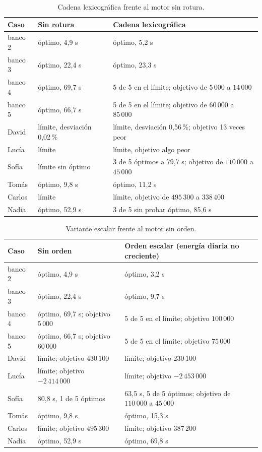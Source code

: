 \begin{table}[htbp]
\centering
\small
\begin{tabular}{|p{1.4cm}|p{4.2cm}|p{7.4cm}|}
\hline
\textbf{Caso} & \textbf{Sin rotura} & \textbf{Cadena lexicográfica} \\
\hline
banco 2 & óptimo, 4,9 s & óptimo, 5,2 s \\
\hline
banco 3 & óptimo, 22,4 s & óptimo, 23,3 s \\
\hline
banco 4 & óptimo, 69,7 s & 5 de 5 en el límite; objetivo de $5\,000$ a $14\,000$ \\
\hline
banco 5 & óptimo, 66,7 s & 5 de 5 en el límite; objetivo de $60\,000$ a $85\,000$ \\
\hline
David & límite, desviación 0,02\,\% & límite, desviación 0,56\,\%; objetivo 13 veces peor \\
\hline
Lucía & límite & límite, objetivo algo peor \\
\hline
Sofía & límite sin óptimo & 3 de 5 óptimos a 79,7 s; objetivo de $110\,000$ a $45\,000$ \\
\hline
Tomás & óptimo, 9,8 s & óptimo, 11,2 s \\
\hline
Carlos & límite & límite, objetivo de $495\,300$ a $338\,400$ \\
\hline
Nadia & óptimo, 52,9 s & 3 de 5 sin probar óptimo, 85,6 s \\
\hline
\end{tabular}
\caption{Cadena lexicográfica frente al motor sin rotura.}
\label{tab:anexoSimetriaLex}
\end{table}

\begin{table}[htbp]
\centering
\small
\begin{tabular}{|p{1.4cm}|p{5.2cm}|p{6.4cm}|}
\hline
\textbf{Caso} & \textbf{Sin orden} & \textbf{Orden escalar (energía diaria no creciente)} \\
\hline
banco 2 & óptimo, 4,9 s & óptimo, 3,2 s \\
\hline
banco 3 & óptimo, 22,4 s & óptimo, 9,7 s \\
\hline
banco 4 & óptimo, 69,7 s; objetivo $5\,000$ & 5 de 5 en el límite; objetivo $100\,000$ \\
\hline
banco 5 & óptimo, 66,7 s; objetivo $60\,000$ & 5 de 5 en el límite; objetivo $75\,000$ \\
\hline
David & límite; objetivo $430\,100$ & límite; objetivo $230\,100$ \\
\hline
Lucía & límite; objetivo $-2\,414\,000$ & límite; objetivo $-2\,453\,000$ \\
\hline
Sofía & 80,8 s, 1 de 5 óptimos & 63,5 s, 5 de 5 óptimos; objetivo de $110\,000$ a $45\,000$ \\
\hline
Tomás & óptimo, 9,8 s & óptimo, 15,3 s \\
\hline
Carlos & límite; objetivo $495\,300$ & límite; objetivo $387\,200$ \\
\hline
Nadia & óptimo, 52,9 s & óptimo, 69,8 s \\
\hline
\end{tabular}
\caption{Variante escalar frente al motor sin orden.}
\label{tab:anexoSimetriaEscalar}
\end{table}

